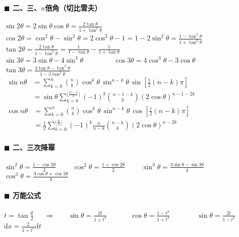 \paragraph{$\blacksquare$ 二、三、$n$倍角（切比雪夫）\\}
$\sin 2\theta =2\sin \theta \cos \theta =\frac{2\tan \theta}{1+\tan ^2 \theta}$\\
$\cos 2\theta =\cos ^2 \theta -\sin ^2 \theta =2\cos ^2 \theta -1=1-2\sin ^2 \theta=\frac{1-\tan ^2 \theta}{1+\tan ^2 \theta}$\\
$\tan 2\theta =\frac{2\tan \theta}{1-\tan ^2 \theta}=\frac{1}{1-\tan \theta}-\frac{1}{1+\tan \theta}$\\
$\sin 3\theta =3\sin \theta-4\sin ^3 \theta$~~~~~~~~
$\cos 3\theta=4\cos ^3 \theta-3\cos \theta$~~~~~~~~
$\tan 3\theta=\frac{3\tan \theta -\tan ^3 \theta}{1-3\tan ^2 \theta}$\\
$\begin{aligned} \sin n\theta &=\sum _{{k=0}}^{n}{\binom  {n}{k}}\cos ^{k}\theta \,\sin ^{{n-k}}\theta \,\sin \left[{\frac  {1}{2}}(n-k)\pi \right] \\&=\sin \theta \sum _{{k=0}}^{{\lfloor {\frac  {n-1}{2}}\rfloor }}(-1)^{k}{\binom  {n-1-k}{k}}(2\cos \theta )^{n-1-2k} \end{aligned}$\\
$\begin{aligned} \cos n\theta &=\sum _{{k=0}}^{n}{\binom  {n}{k}}\cos ^{k}\theta \,\sin ^{{n-k}}\theta \,\cos \left[{\frac  {1}{2}}(n-k)\pi \right] \\&={\frac  {1}{2}}\sum _{{k=0}}^{{\lfloor {\frac  {n}{2}}\rfloor }}(-1)^{k}{\frac  {n}{n-k}}{\binom  {n-k}{k}}(2\cos \theta )^{n-2k} \end{aligned}$\\
\paragraph{$\blacksquare$ 二、三次降幂\\}
$\sin ^{2}\theta ={\frac  {1-\cos 2\theta }{2}}$~~~~
$\cos ^{2}\theta ={\frac  {1+\cos 2\theta }{2}}$~~~~
$\sin ^{3}\theta ={\frac  {3\sin \theta -\sin 3\theta }{4}}$~~~~
$\cos ^{3}\theta ={\frac  {3\cos \theta +\cos 3\theta }{4}}$\\
\paragraph{$\blacksquare$ 万能公式\\}
$t=\tan \frac{\theta}{2}$~~~$\Rightarrow$~~~
$\sin \theta = \frac{2t}{1+t^2}$~~~~~~
$\cos \theta = \frac{1-t^2}{1+t^2}$~~~~~~~
$\sin \theta = \frac{2t}{1-t^2}$~~~~~~
$\mathrm{d}x=\frac{2}{1+t^2}\mathrm{d}t$\\
